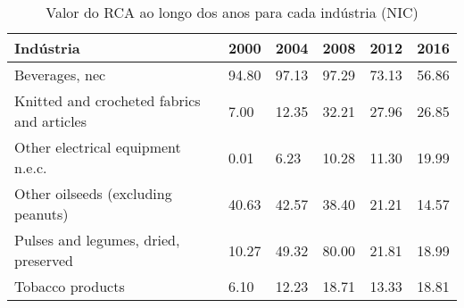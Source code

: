 \begin{table}
\centering
\caption{Valor do RCA ao longo dos anos para cada indústria (NIC)}
\begin{tabular}{p{6cm}p{1.5cm}p{1.5cm}p{1.5cm}p{1.5cm}p{1.5cm}}
\toprule
                                 Indústria &  2000 &  2004 &  2008 &  2012 &  2016 \\
\midrule
                            Beverages, nec & 94.80 & 97.13 & 97.29 & 73.13 & 56.86 \\
Knitted and crocheted fabrics and articles &  7.00 & 12.35 & 32.21 & 27.96 & 26.85 \\
         Other electrical equipment n.e.c. &  0.01 &  6.23 & 10.28 & 11.30 & 19.99 \\
        Other oilseeds (excluding peanuts) & 40.63 & 42.57 & 38.40 & 21.21 & 14.57 \\
      Pulses and legumes, dried, preserved & 10.27 & 49.32 & 80.00 & 21.81 & 18.99 \\
                          Tobacco products &  6.10 & 12.23 & 18.71 & 13.33 & 18.81 \\
\bottomrule
\end{tabular}
\end{table}
